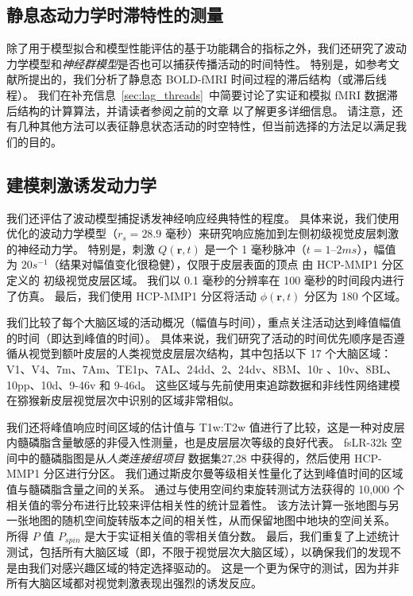 \documentclass[lang=cn,a4paper,newtx,citestyle=gb7714-2015, bibstyle=gb7714-2015]{elegantpaper}
\begin{document}
\subsection{静息态动力学时滞特性的测量} \label{sec:dynamics_measurement}

除了用于模型拟合和模型性能评估的基于功能耦合的指标之外，我们还研究了波动力学模型和\textit{神经群模型}是否也可以捕获传播活动的时间特性。
特别是，如参考文献\cite{mitra2015lag,mitra2014lag}所提出的，我们分析了静息态 BOLD-fMRI 时间过程的滞后结构（或滞后线程）。
我们在补充信息~\ref{sec:lag_threads}~中简要讨论了实证和模拟 fMRI 数据滞后结构的计算算法，并请读者参阅之前的文章\cite{mitra2015lag,mitra2014lag} 以了解更多详细信息。
请注意，还有几种其他方法可以表征静息状态活动的时空特性\cite{bolt2022parsimonious,cabral2017functional,kashyap2019dynamic}，但当前选择的方法足以满足我们的目的。


\subsection{建模刺激诱发动力学} \label{sec:modelling_stimulus}

我们还评估了波动模型捕捉诱发神经响应经典特性的程度。
具体来说，我们使用优化的波动力学模型（$ r_s = 28.9$ 毫秒）来研究响应施加到左侧初级视觉皮层刺激的神经动力学。
特别是，刺激 $ Q(\textbf{r},t) $ 是一个 1 毫秒脉冲（$ t = 1–2 ms $），幅值为 $ 20 s^{-1} $（结果对幅值变化很稳健），仅限于皮层表面的顶点 由 HCP-MMP1 分区定义的 初级视觉皮层区域。
我们以 0.1 毫秒的分辨率在 100 毫秒的时间段内进行了仿真。 
最后，我们使用 HCP-MMP1 分区将活动 $ \phi(\textbf{r},t) $ 分区为 180 个区域。


我们比较了每个大脑区域的活动概况（幅值与时间），重点关注活动达到峰值幅值的时间（即达到峰值的时间）。
具体来说，我们研究了活动的时间优先顺序是否遵循从视觉到额叶皮层的人类视觉皮层层次结构，其中包括以下 17 个大脑区域：V1、V4、7m、7Am、TE1p、7AL、24dd、2、24dv、8BM、10r 、10v、8BL、10pp、10d、9-46v 和 9-46d。
这些区域与先前使用束追踪数据和非线性网络建模在猕猴新皮层视觉层次中识别的区域非常相似\cite{chaudhuri2015large}。


我们还将峰值响应时间区域的估计值与 T1w:T2w 值进行了比较，这是一种对皮层内髓磷脂含量敏感的非侵入性测量\cite{glasser2011mapping}，也是皮层层次等级\cite{burt2018hierarchy}的良好代表。
fsLR-32k 空间中的髓磷脂图是从\textit{人类连接组项目} 数据集27,28 中获得的，然后使用 HCP-MMP1 分区进行分区。
我们通过斯皮尔曼等级相关性量化了达到峰值时间的区域值与髓磷脂含量之间的关系。
通过与使用空间约束旋转测试方法获得的 10,000 个相关值的零分布进行比较来评估相关性的统计显着性\cite{vavsa2018adolescent,alexander2018testing}。
该方法计算一张地图与另一张地图的随机空间旋转版本之间的相关性，从而保留地图中地块的空间关系。
所得 $ P $ 值 $ P_{spin} $ 是大于实证相关值的零相关值分数。
最后，我们重复了上述统计测试，包括所有大脑区域（即，不限于视觉层次大脑区域），以确保我们的发现不是由我们对感兴趣区域的特定选择驱动的。
这是一个更为保守的测试，因为并非所有大脑区域都对视觉刺激表现出强烈的诱发反应。
\end{document}
